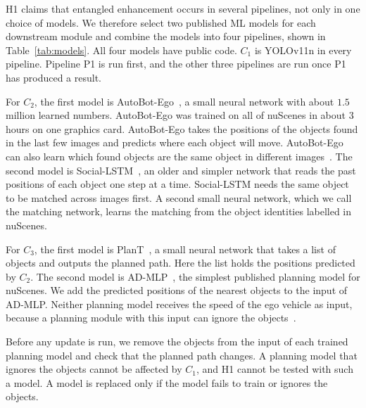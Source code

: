 \documentclass[11pt,a4paper]{article}
\begin{document}
H1 claims that entangled enhancement occurs in several pipelines, not only
in one choice of models. We therefore select two published ML models for
each downstream module and combine the models into four pipelines, shown
in Table~\ref{tab:models}. All four models have public code. $C_1$ is
YOLOv11n in every pipeline. Pipeline P1 is run first, and the other three
pipelines are run once P1 has produced a result.

For $C_2$, the first model is AutoBot-Ego~\cite{girgis2022autobots}, a small
neural network with about $1.5$ million learned numbers. AutoBot-Ego was
trained on all of nuScenes in about $3$ hours on one graphics card.
AutoBot-Ego takes the positions of the objects found in the last few images
and predicts where each object will move. AutoBot-Ego can also learn which
found objects are the same object in different images~\cite{weng2022whose}.
The second model is Social-LSTM~\cite{alahi2016social}, an older and simpler
network that reads the past positions of each object one step at a time.
Social-LSTM needs the same object to be matched across images first. A
second small neural network, which we call the matching network, learns
the matching from the object
identities labelled in nuScenes.

For $C_3$, the first model is PlanT~\cite{renz2022plant}, a small neural
network that takes a list of objects and outputs the planned path. Here
the list holds the positions predicted by $C_2$. The second model is
AD-MLP~\cite{zhai2023rethinking}, the simplest published planning model for
nuScenes. We add the predicted positions of the nearest objects to the
input of AD-MLP. Neither planning model receives the speed of the ego
vehicle as input, because a planning module with this input can ignore the
objects~\cite{zhai2023rethinking,li2024egostatus}.

Before any update is run, we remove the objects from the input of each
trained planning model and check that the planned path changes. A planning
model that ignores the objects cannot be affected by $C_1$, and H1 cannot
be tested with such a model. A model is replaced only if the model fails
to train or ignores the objects.
\end{document}
